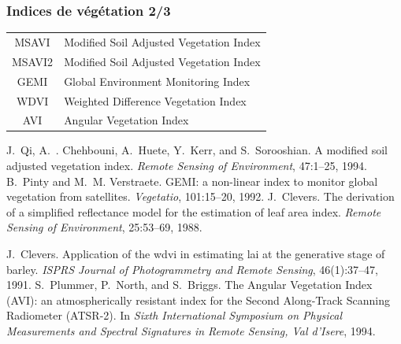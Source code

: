 \documentclass[compress,handout]{beamer}
\begin{document}
\begin{frame}
\frametitle{Indices de végétation 2/3}
\footnotesize \centering
\begin{tabular}{|c|l|}
\hline
MSAVI & Modified Soil Adjusted Vegetation Index  \cite{Qi1994-MSAVI} \\
MSAVI2 & Modified Soil Adjusted Vegetation Index  \cite{Qi1994-MSAVI} \\
GEMI &   Global Environment Monitoring Index \cite{Pinty1992-GEMI} \\
WDVI & Weighted Difference Vegetation Index  \cite{Clevers1988-WDVI,Clevers1991-WDVI} \\ 
AVI & Angular Vegetation Index  \cite{AVI}\\
\hline
\end{tabular}
\begin{thebibliography}{noidea}
\tiny
{}
J.~Qi, A.~. Chehbouni, A.~Huete, Y.~Kerr, and S.~Sorooshian.
 A modified soil adjusted vegetation index.
 {\em Remote Sensing of Environment}, 47:1--25, 1994.
B.~Pinty and M.~M. Verstraete.
 {GEMI}: a non-linear index to monitor global vegetation from
  satellites.
 {\em Vegetatio}, 101:15--20, 1992.
J.~Clevers.
 The derivation of a simplified reflectance model for the estimation
  of leaf area index.
 {\em Remote Sensing of Environment}, 25:53--69, 1988.

J.~Clevers.
 Application of the wdvi in estimating lai at the generative stage of
  barley.
 {\em ISPRS Journal of Photogrammetry and Remote Sensing},
  46(1):37--47, 1991.
S.~Plummer, P.~North, and S.~Briggs.
 {The Angular Vegetation Index (AVI): an atmospherically resistant
  index for the Second Along-Track Scanning Radiometer (ATSR-2)}.
 In {\em Sixth International Symposium on Physical Measurements and
  Spectral Signatures in Remote Sensing, Val d'Isere}, 1994.
\end{thebibliography}
\end{frame}
\end{document}

